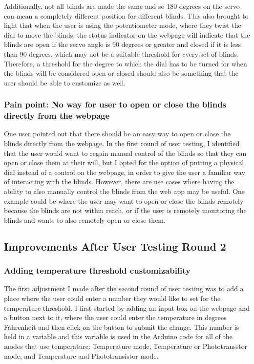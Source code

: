 \documentclass[10pt,twocolumn]{article}
\begin{document}
Additionally, not all blinds are made the same and so 180 degrees on the servo can mean a completely different position for different blinds. This also brought to light that when the user is using the potentiometer mode, where they twist the dial to move the blinds, the status indicator on the webpage will indicate that the blinds are open if the servo angle is 90 degrees or greater and closed if it is less than 90 degrees, which may not be a suitable threshold for every set of blinds. Therefore, a threshold for the degree to which the dial has to be turned for when the blinds will be considered open or closed should also be something that the user should be able to customize as well. 

\subsubsection{Pain point: No way for user to open or close the blinds directly from the webpage}
One user pointed out that there should be an easy way to open or close the blinds directly from the webpage. In the first round of user testing, I identified that the user would want to regain manual control of the blinds so that they can open or close them at their will, but I opted for the option of putting a physical dial instead of a control on the webpage, in order to give the user a familiar way of interacting with the blinds. However, there are use cases where having the ability to also manually control the blinds from the web app may be useful. One example could be where the user may want to open or close the blinds remotely because the blinds are not within reach, or if the user is remotely monitoring the blinds and wants to also remotely open or close them.

\subsection{Improvements After User Testing Round 2}
\subsubsection{Adding temperature threshold customizability}
The first adjustment I made after the second round of user testing was to add a place where the user could enter a number they would like to set for the temperature threshold. I first started by adding an input box on the webpage and a button next to it, where the user could enter the temperature in degrees Fahrenheit and then click on the button to submit the change. This number is held in a variable and this variable  is used in the Arduino code for all of the modes that use temperature: Temperature mode, Temperature or Phototransstor mode, and Temperature and Phototransistor mode.
\end{document}
